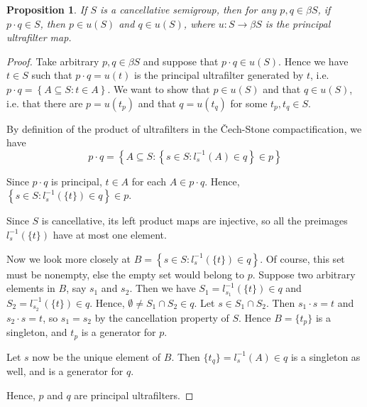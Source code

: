 \documentclass[11pt,letterpaper]{article}
\newtheorem{prop}{Proposition}
\newcommand{\inv}{^{-1}}
\newcommand{\intersn}{\cap}
\newcommand{\setof}[1]{\left\{#1\right\}}
\newcommand{\cechstone}{\v{C}ech-Stone}
\begin{document}
\begin{prop}
    If $S$ is a cancellative semigroup,
    then for any $p, q \in \beta S$,
    if $p \cdot q \in S$, then $p \in u(S)$ and $q \in u(S)$,
    where $u : S \to \beta S$ is the principal ultrafilter map.
\end{prop}

\begin{proof}
    Take arbitrary $p, q \in \beta S$ and suppose that $p \cdot q \in u(S)$.
    Hence we have $t \in S$ such that $p \cdot q = u(t)$ is the principal
    ultrafilter generated by $t$,
    i.e. $p \cdot q = \setof{A \subseteq S : t \in A}$.
    We want to show that $p \in u(S)$ and that $q \in u(S)$,
    i.e. that there are $p = u(t_p)$ and that $q = u(t_q)$
    for some $t_p, t_q \in S$.

    By definition of the product of ultrafilters in the \cechstone{}
    compactification, we have
    \begin{equation*}
        p \cdot q = \setof{
            A \subseteq S :
            \setof{
                s \in S :
                l_s\inv(A) \in q
            }
            \in p
        }
    \end{equation*}

    Since $p \cdot q$ is principal, $t \in A$ for each $A \in p \cdot q$.
    Hence, $\setof{s \in S : l_s\inv(\{t\}) \in q} \in p$.

    Since $S$ is cancellative, its left product maps are injective,
    so all the preimages $l_s\inv(\{t\})$ have at most one element.

    Now we look more closely at
    $B = \setof{s \in S : l_s\inv(\{t\}) \in q}$.
    Of course, this set must be nonempty, else the empty set would belong to
    $p$.
    Suppose two arbitrary elements in $B$, say $s_1$ and $s_2$.
    Then we have $S_1 = l_{s_1}\inv(\{t\}) \in q$
    and $S_2 = l_{s_2}\inv(\{t\}) \in q$.
    Hence, $\emptyset \neq S_1 \intersn S_2 \in q$.
    Let $s \in S_1 \intersn S_2$. Then $s_1 \cdot s = t$ and $s_2 \cdot s = t$,
    so $s_1 = s_2$ by the cancellation property of $S$.
    Hence $B = \{t_p\}$ is a singleton, and $t_p$ is a generator for $p$.

    Let $s$ now be the unique element of $B$.
    Then $\{t_q\} = l_s\inv(A) \in q$ is a singleton as well,
    and is a generator for $q$.

    Hence, $p$ and $q$ are principal ultrafilters.
\end{proof}
\end{document}

